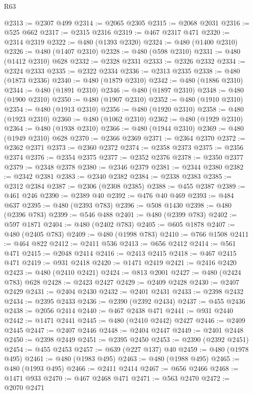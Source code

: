 \begin{lexlean}{R63}
\begin{coremodule}
@2313 := @2307 @499
@2314 := @2065 @2305
@2315 := @2068 @2031
@2316 := @525 @662
@2317 := @2315 @2316
@2319 := @467 @2317 @471
@2320 := @2314 @2319
@2322 := @480 (@1393 @2320)
@2324 := @480 (@1400 @2310)
@2326 := @480 (@1407 @2310)
@2328 := @480 (@598 @2310)
@2331 := @480 (@1412 @2310) @628
@2332 := @2328 @2331
@2333 := @2326 @2332
@2334 := @2324 @2333
@2335 := @2322 @2334
@2336 := @2313 @2335
@2338 := @480 (@1873 @2336)
@2340 := @480 (@1879 @2310)
@2342 := @480 (@1886 @2310)
@2344 := @480 (@1891 @2310)
@2346 := @480 (@1897 @2310)
@2348 := @480 (@1900 @2310)
@2350 := @480 (@1907 @2310)
@2352 := @480 (@1910 @2310)
@2354 := @480 (@1913 @2310)
@2356 := @480 (@1920 @2310)
@2358 := @480 (@1923 @2310)
@2360 := @480 (@1062 @2310)
@2362 := @480 (@1929 @2310)
@2364 := @480 (@1938 @2310)
@2366 := @480 (@1944 @2310)
@2369 := @480 (@1949 @2310) @628
@2370 := @2366 @2369
@2371 := @2364 @2370
@2372 := @2362 @2371
@2373 := @2360 @2372
@2374 := @2358 @2373
@2375 := @2356 @2374
@2376 := @2354 @2375
@2377 := @2352 @2376
@2378 := @2350 @2377
@2379 := @2348 @2378
@2380 := @2346 @2379
@2381 := @2344 @2380
@2382 := @2342 @2381
@2383 := @2340 @2382
@2384 := @2338 @2383
@2385 := @2312 @2384
@2387 := @2306 (@2308 @2385)
@2388 := @455 @2387
@2389 := @461 @246
@2390 := @2389 @40
@2392 := @476 @40 @469
@2393 := @484 @637
@2395 := @480 (@2393 @783)
@2396 := @508 @1430
@2398 := @480 (@2396 @783)
@2399 := @546 @488
@2401 := @480 (@2399 @783)
@2402 := @597 @1871
@2404 := @480 (@2402 @783)
@2405 := @605 @1878
@2407 := @480 (@2405 @783)
@2409 := @480 (@1998 @783)
@2410 := @766 @1508
@2411 := @464 @822
@2412 := @2411 @536
@2413 := @656 @2412
@2414 := @561 @471
@2415 := @2048 @2414
@2416 := @2413 @2415
@2418 := @467 @2415 @471
@2419 := @931 @2418
@2420 := @1471 @2419
@2421 := @2416 @2420
@2423 := @480 (@2410 @2421)
@2424 := @813 @2001
@2427 := @480 (@2424 @783) @628
@2428 := @2423 @2427
@2429 := @2409 @2428
@2430 := @2407 @2429
@2431 := @2404 @2430
@2432 := @2401 @2431
@2433 := @2398 @2432
@2434 := @2395 @2433
@2436 := @2390 (@2392 @2434)
@2437 := @455 @2436
@2438 := @2056 @2414
@2440 := @467 @2438 @471
@2441 := @931 @2440
@2442 := @1471 @2441
@2445 := @480 (@2410 @2442) @2427
@2446 := @2409 @2445
@2447 := @2407 @2446
@2448 := @2404 @2447
@2449 := @2401 @2448
@2450 := @2398 @2449
@2451 := @2395 @2450
@2453 := @2390 (@2392 @2451)
@2454 := @455 @2453
@2457 := @639 (@227 @137) @40
@2459 := @480 (@1978 @495)
@2461 := @480 (@1983 @495)
@2463 := @480 (@1988 @495)
@2465 := @480 (@1993 @495)
@2466 := @2411 @2414
@2467 := @656 @2466
@2468 := @1471 @933
@2470 := @467 @2468 @471
@2471 := @563 @2470
@2472 := @2070 @2471

\end{coremodule}
\end{lexlean}
